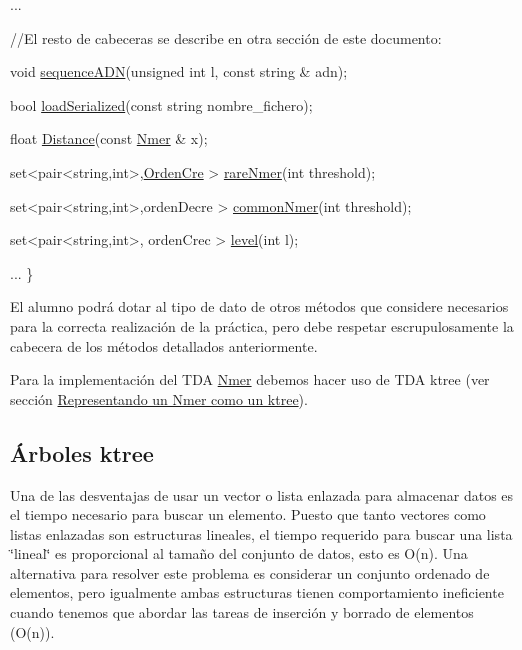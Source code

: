 \begin{DoxyCode}
  ...
 
  \textcolor{comment}{//El resto de cabeceras se describe en otra sección de este documento: }

  \textcolor{keywordtype}{void} \hyperlink{classNmer_a4c29aa3845d91b09f8e0bc3517ca4ec6}{sequenceADN}(\textcolor{keywordtype}{unsigned} \textcolor{keywordtype}{int} l, \textcolor{keyword}{const} \textcolor{keywordtype}{string} & adn);  

  \textcolor{keywordtype}{bool} \hyperlink{classNmer_a418c016bb6e04d2f699ddb694ee0221f}{loadSerialized}(\textcolor{keyword}{const} \textcolor{keywordtype}{string} nombre\_fichero);
 
  \textcolor{keywordtype}{float}  \hyperlink{classNmer_a8df2f2f355423b02413e5e29dc5639e8}{Distance}(\textcolor{keyword}{const} \hyperlink{classNmer}{Nmer} & x);

  set<pair<string,int>,\hyperlink{classOrdenCre}{OrdenCre} > \hyperlink{classNmer_a8120d82bd305662b814bdcdb30698989}{rareNmer}(\textcolor{keywordtype}{int} threshold); 

  set<pair<string,int>,ordenDecre > \hyperlink{classNmer_aabaa2a3f2761170b5cbee0e822805de8}{commonNmer}(\textcolor{keywordtype}{int} threshold);

  set<pair<string,int>, ordenCrec > \hyperlink{classNmer_a97de70ffe49a0457e87ed249251b9c14}{level}(\textcolor{keywordtype}{int} l);

  ...
\}
\end{DoxyCode}


El alumno podrá dotar al tipo de dato de otros métodos que considere necesarios para la correcta realización de la práctica, pero debe respetar escrupulosamente la cabecera de los métodos detallados anteriormente.

Para la implementación del T\+DA \hyperlink{classNmer}{Nmer} debemos hacer uso de T\+DA ktree (ver sección \hyperlink{index_ktreegen}{Representando un Nmer como un ktree}).\hypertarget{index_secKtree}{}\subsection{Árboles ktree}\label{index_secKtree}
Una de las desventajas de usar un vector o lista enlazada para almacenar datos es el tiempo necesario para buscar un elemento. Puesto que tanto vectores como listas enlazadas son estructuras lineales, el tiempo requerido para buscar una lista \char`\"{}lineal\char`\"{} es proporcional al tamaño del conjunto de datos, esto es O(n). Una alternativa para resolver este problema es considerar un conjunto ordenado de elementos, pero igualmente ambas estructuras tienen comportamiento ineficiente cuando tenemos que abordar las tareas de inserción y borrado de elementos (O(n)).

